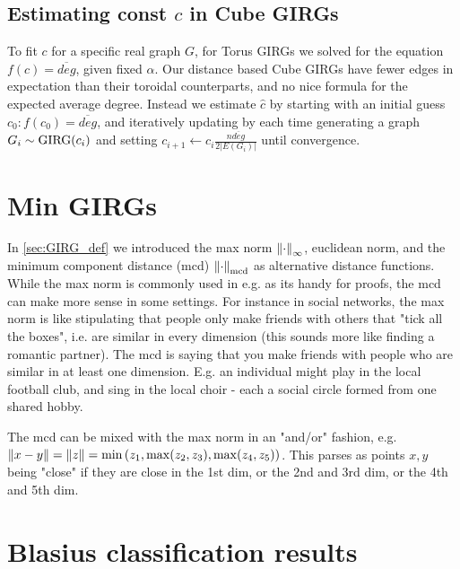 \subsection{Estimating const $c$ in Cube GIRGs}
To fit $c$ for a specific real graph $G$, for Torus GIRGs we solved for the equation $f(c) = \overline{deg}$, given fixed $\alpha$. Our distance based Cube GIRGs have fewer edges in expectation than their toroidal counterparts, and no nice formula for the expected average degree. Instead we estimate $\hat{c}$ by starting with an initial guess $c_0: f(c_0) = \overline{deg}$, and iteratively updating by each time generating a graph $G_i \sim \mathrm{GIRG}(c_i)$ and setting $c_{i+1} \gets c_i \frac{n \overline{deg}}{2 |E(G_i)|}$ until convergence.


\section{Min GIRGs}
In \cref{sec:GIRG_def} we introduced the max norm $\left\lVert \cdot\right\rVert_\infty$, euclidean norm, and the minimum component distance (mcd) $\left\lVert \cdot\right\rVert_{\mathrm{mcd}}$ as alternative distance functions.
While the max norm is commonly used in e.g. \cite{bringmann2019geometric} as its handy for proofs, the mcd can make more sense in some settings. For instance in social networks, the max norm is like stipulating that people only make friends with others that "tick all the boxes", i.e. are similar in every dimension (this sounds more like finding a romantic partner). The mcd is saying that you make friends with people who are similar in at least one dimension. E.g. an individual might play in the local football club, and sing in the local choir - each a social circle formed from one shared hobby.

The mcd can be mixed with the max norm in an "and/or" fashion, e.g. $\left\lVert x - y\right\rVert = \left\lVert z\right\rVert = \min \left ( z_1, \max (z_2, z_3), \max (z_4, z_5) \right )$.
This parses as points $x, y$ being "close" if they are close in the 1st dim, or the 2nd and 3rd dim, or the 4th and 5th dim.

\section{Blasius classification results}

